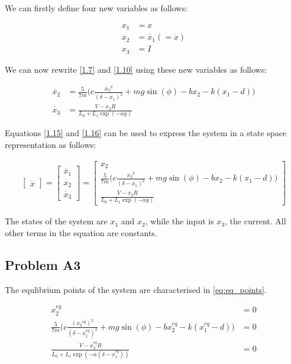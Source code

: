 \documentclass[a4paper,10pt,reqno]{amsart}
\numberwithin{equation}{section}
\begin{document}
We can firstly define four new variables as follows:

\begin{align}
x_1 &= x \label{1.12} \\
x_2 &= \dot{x_1} (= \dot{x}) \label{1.13} \\
x_3 &= I \label{1.14}
\end{align}

\newline We can now rewrite \ref{1.7} and \ref{1.10} using these new variables as follows:

\begin{align}
\dot{x_2} &= \frac{5}{7m}\bigg(c \frac{{x_3}^2}{(\delta - x_1)^2} + mg\sin(\phi) - bx_2 - k(x_1-d)\bigg) \label{1.15} \\
\dot{x_3} &= \frac{V - x_3 R}{L_0 + L_1\exp(-\alpha y)} \label{1.16}
\end{align}

\newline Equations \ref{1.15} and \ref{1.16} can be used to express the system in a state space representation as follows:

\begin{align}
\begin{bmatrix}
\dot{x}
\end{bmatrix} 
= 
\begin{bmatrix}
\dot{x_1}\\
\dot{x_2}\\
\dot{x_3}
\end{bmatrix}
= 
\begin{bmatrix}
x_2 \\
\frac{5}{7m}\bigg(c \frac{{x_3}^2}{(\delta - x_1)^2} + mg\sin(\phi) - bx_2 - k(x_1-d)\bigg)\\
\frac{V - x_3 R}{L_0 + L_1\exp(-\alpha y)}
\end{bmatrix}
\label{1.17}
\end{align}

\newline The states of the system are $x_1$ and $x_2$, while the input is $x_3$, the current. All other terms in the equation are constants.



\subsection{Problem A3}\label{sec:a3}
The equlibrium points of the system are characterised in \ref{eq:eq_points}.

\begin{subequations}\label{eq:eq_points}
\begin{align}
      x^{eq}_{2} &= 0 \label{1.18a} \\
     \frac{5}{7m}\bigg(c \frac{({x_3}^{eq})^2}{(\delta - x_1^{eq})^2} + mg\sin(\phi) - bx_2^{eq} - k(x_1^{eq}-d)\bigg) &= 0 \label{1.18b} \\
     \frac{V - x_3^{eq}R}{L_0 + L_1\exp(-\alpha(\delta - x_1^{eq}))} &= 0 \label{1.18c}
\end{align}
\end{subequations}
\end{document}
